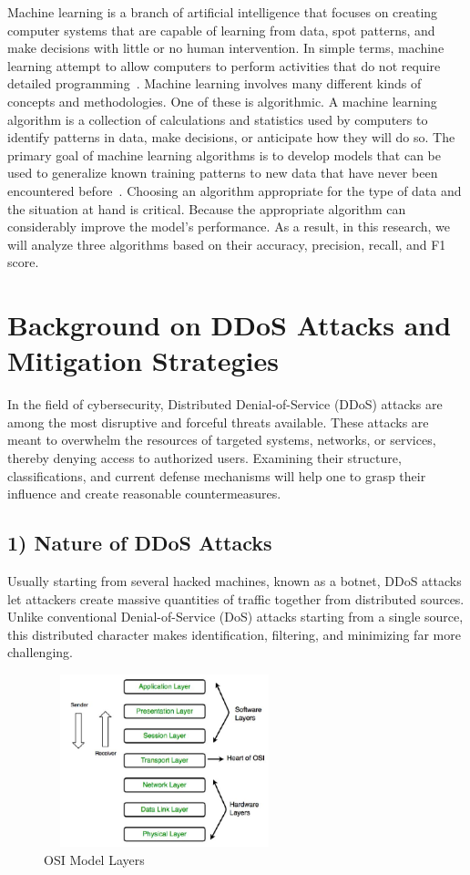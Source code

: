 \documentclass[conference]{IEEEtran}
\begin{document}
Machine learning is a branch of artificial intelligence that focuses on creating computer systems that are capable of learning from data, spot patterns, and make decisions with little or no human intervention.  In simple terms, machine learning attempt to allow computers to perform activities that do not require detailed programming~\cite{5}.  Machine learning involves many different kinds of concepts and methodologies.  One of these is algorithmic.  A machine learning algorithm is a collection of calculations and statistics used by computers to identify patterns in data, make decisions, or anticipate how they will do so.  The primary goal of machine learning algorithms is to develop models that can be used to generalize known training patterns to new data that have never been encountered before~\cite{6}.  Choosing an algorithm appropriate for the type of data and the situation at hand is critical.  Because the appropriate algorithm can considerably improve the model's performance.  As a result, in this research, we will analyze three algorithms based on their accuracy, precision, recall, and F1 score.

\section{Background on DDoS Attacks and Mitigation Strategies}

In the field of cybersecurity, Distributed Denial-of-Service (DDoS) attacks are among the most disruptive and forceful threats available. These attacks are meant to overwhelm the resources of targeted systems, networks, or services, thereby denying access to authorized users. Examining their structure, classifications, and current defense mechanisms will help one to grasp their influence and create reasonable countermeasures.~\cite{12}

\subsection*{1) Nature of DDoS Attacks}
Usually starting from several hacked machines, known as a botnet, DDoS attacks let attackers create massive quantities of traffic together from distributed sources. Unlike conventional Denial-of-Service (DoS) attacks starting from a single source, this distributed character makes identification, filtering, and minimizing far more challenging.

\begin{figure}[htbp]
\centerline{\includegraphics[height=5cm,width=7cm]{OSIModel.JPG}}
\caption{OSI Model Layers ~\cite{13}}
\label{fig:OSI}
\end{figure}
\end{document}
